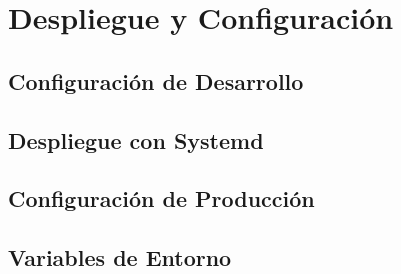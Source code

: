 \chapter{Despliegue y Configuración}
\section{Configuración de Desarrollo}
\section{Despliegue con Systemd}
\section{Configuración de Producción}
\section{Variables de Entorno}
